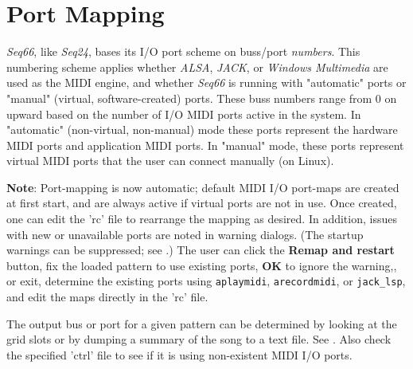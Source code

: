 %
%
%

\section{Port Mapping}
\label{sec:port_mapping}

   \textsl{Seq66}, like \textsl{Seq24}, bases its I/O port scheme on buss/port
   \textsl{numbers}.
   This numbering scheme applies whether
   \textsl{ALSA}, \textsl{JACK}, or \textsl{Windows Multimedia}
   are used as the MIDI engine, and whether \textsl{Seq66} is running with
   "automatic" ports or "manual" (virtual, software-created) ports.
   These buss numbers range from 0 on upward
   based on the number of I/O MIDI ports active in the system.
   In "automatic" (non-virtual, non-manual) mode
   these ports represent the hardware MIDI ports and application MIDI ports.
   In "manual" mode, these ports represent virtual MIDI ports that the user
   can connect manually (on Linux).

   \textbf{Note}:
   Port-mapping is now automatic; default MIDI I/O port-maps are
   created at first start, and are always active if virtual ports are not in
   use.  Once created, one can edit the 'rc' file to rearrange the mapping as
   desired.
   In addition, issues with new or unavailable ports are
   noted in warning dialogs.
   (The startup warnings can be suppressed;
   see .)
   The user can click the \textbf{Remap and restart} button,
   fix the loaded pattern to use existing ports, \textbf{OK} to ignore
   the warning,,
   or exit, determine the existing ports using
   \texttt{aplaymidi}, \texttt{arecordmidi}, or \texttt{jack\_lsp},
   and edit the maps directly in the 'rc' file.

   The output bus or port for a given pattern can be determined by
   looking at the grid slots or by dumping a summary of the song to
   a text file.
   See .
   Also check the specified 'ctrl' file to see if it is using
   non-existent MIDI I/O ports.

